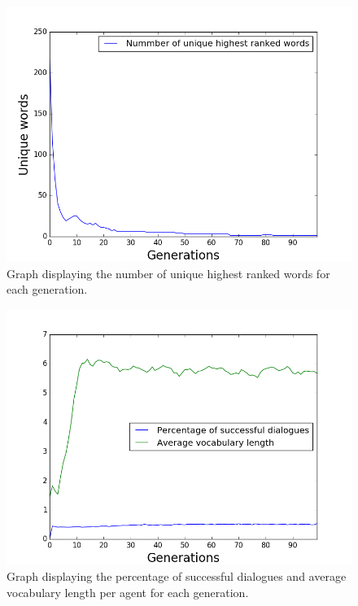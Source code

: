 \begin{figure}[htbp]
    \centering
    \includegraphics[scale=0.5]{fig/Results/Exp7/UniqueWords1}
    \caption{Graph displaying the number of unique highest ranked words for each generation.}
    \label{fig:UniqueWords7}
\end{figure}
\begin{figure}[htbp]
    \centering
    \includegraphics[scale=0.5]{fig/Results/Exp7/Vocabulary1}
    \caption{Graph displaying the percentage of successful dialogues and average vocabulary length per agent for each generation.}
    \label{fig:Vocabulary7}
\end{figure}
